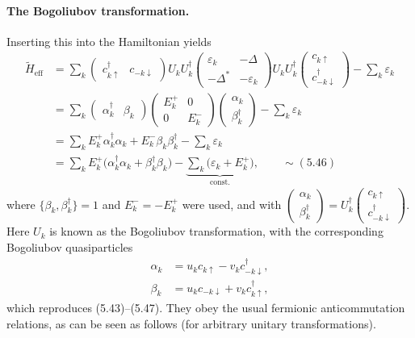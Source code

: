 \documentclass[../../main.tex]{subfiles}
\begin{document}
\paragraph{The Bogoliubov transformation.}
Inserting this into the Hamiltonian yields
\begin{align}
\tilde H_{\mathrm{eff}}
&=\sum_k\begin{pmatrix}c^\dagger_{k\uparrow}&c_{-k\downarrow}\end{pmatrix}
  U_kU^\dagger_k
  \begin{pmatrix}\varepsilon_k&-\Delta\\-\Delta^*&-\varepsilon_k\end{pmatrix}
  U_kU^\dagger_k
  \begin{pmatrix}c_{k\uparrow}\\c^\dagger_{-k\downarrow}\end{pmatrix}
  -\sum_k\varepsilon_k\\
&=\sum_k\begin{pmatrix}\alpha^\dagger_k&\beta_k\end{pmatrix}
  \begin{pmatrix}E_k^+&0\\0&E_k^-\end{pmatrix}
  \begin{pmatrix}\alpha_k\\\beta^\dagger_k\end{pmatrix}-\sum_k\varepsilon_k\\
&=\sum_k E_k^+\alpha^\dagger_k\alpha_k+E_k^-\beta_k\beta^\dagger_k
  -\sum_k\varepsilon_k\\
&=\sum_k E_k^+\big(\alpha^\dagger_k\alpha_k+\beta^\dagger_k\beta_k\big)
  -\underbrace{\sum_k\big(\varepsilon_k+E_k^+\big)}_{\text{const.}},
  \qquad\sim(5.46)
\end{align}
where $\{\beta_k,\beta^\dagger_k\}=1$ and $E_k^-=-E_k^+$ were used, and with
$\begin{pmatrix}\alpha_k\\\beta^\dagger_k\end{pmatrix}
=U^\dagger_k\begin{pmatrix}c_{k\uparrow}\\c^\dagger_{-k\downarrow}\end{pmatrix}$.
Here $U_k$ is known as the Bogoliubov transformation, with the corresponding Bogoliubov
quasiparticles
\begin{align}
\alpha_k&=u_k c_{k\uparrow}-v_k c^\dagger_{-k\downarrow},\\
\beta_k&=u_k c_{-k\downarrow}+v_k c^\dagger_{k\uparrow},
\end{align}
which reproduces (5.43)--(5.47). They obey the usual fermionic anticommutation
relations, as can be seen as follows (for arbitrary unitary transformations).
\end{document}
